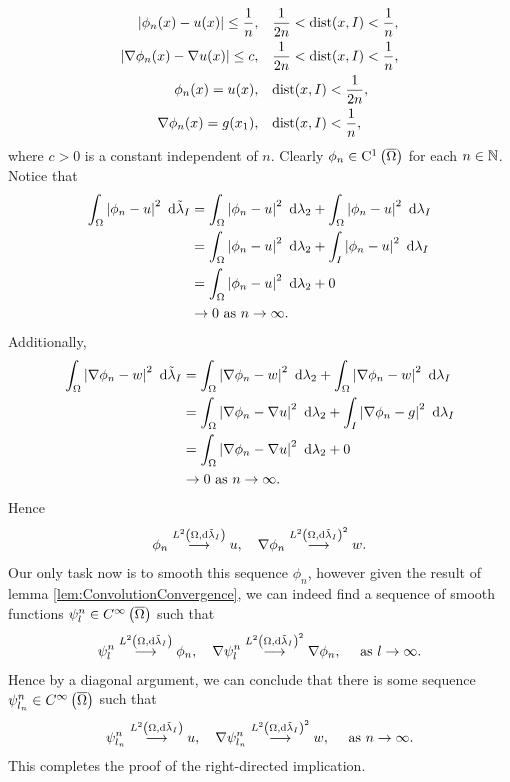 \documentclass[11pt]{report}
\theoremstyle{plain}
\newcommand{\tlambda}{\tilde{\lambda}}
\newcommand{\C}[1]{\mathrm{C}^1\bracs{#1}}
\begin{document}
\begin{enumerate}
\begin{subequations}
\begin{align}
			\left\lvert \phi_n(x) - u(x) \right\rvert \leq \frac{1}{n}, &\quad \frac{1}{2n}<\mathrm{dist}(x,I)<\frac{1}{n}, \\
			\left\lvert \nabla\phi_n(x) - \nabla u(x) \right\rvert \leq c, &\quad \frac{1}{2n}<\mathrm{dist}(x,I)<\frac{1}{n}, \\
			\phi_n(x) = u(x), &\quad \mathrm{dist}(x,I)<\frac{1}{2n}, \\
			\nabla\phi_n(x) = g(x_1), &\quad \mathrm{dist}(x,I)<\frac{1}{n},
		\end{align}
	\end{subequations}
	where $c>0$ is a constant independent of $n$.
	Clearly $\phi_n\in\C{\overline{\ddom}}$ for each $n\in\mathbb{N}$.
	Notice that
	\begin{align*}
		\integral{\ddom}{\abs{\phi_n - u}^2}{\tlambda_I}
		&= \integral{\ddom}{\abs{\phi_n - u}^2}{\lambda_2} + \integral{\ddom}{\abs{\phi_n - u}^2}{\lambda_I} \\
		&= \integral{\ddom}{\abs{\phi_n - u}^2}{\lambda_2} + \integral{I}{\abs{\phi_n - u}^2}{\lambda_I} \\
		&= \integral{\ddom}{\abs{\phi_n - u}^2}{\lambda_2} + 0 \\
		&\rightarrow 0 \toInfty{n}.
	\end{align*}
	Additionally,
	\begin{align*}
		\integral{\ddom}{\abs{\grad\phi_n - w}^2}{\tlambda_I}
		&= \integral{\ddom}{\abs{\grad\phi_n - w}^2}{\lambda_2} + \integral{\ddom}{\abs{\grad\phi_n - w}^2}{\lambda_I} \\
		&= \integral{\ddom}{\abs{\grad\phi_n - \grad u}^2}{\lambda_2} + \integral{I}{\abs{\grad\phi_n - g}^2}{\lambda_I} \\
		&= \integral{\ddom}{\abs{\grad\phi_n - \grad u}^2}{\lambda_2} + 0 \\
		&\rightarrow 0 \toInfty{n}.
	\end{align*}
	Hence
	\begin{align*}
		\phi_n \lconv{\ltwo{\ddom}{\tlambda_I}} u, \quad \grad\phi_n \lconv{\ltwo{\ddom}{\tlambda_I}^2} w.
	\end{align*}
	Our only task now is to smooth this sequence $\phi_n$, however given the result of lemma \ref{lem:ConvolutionConvergence}, we can indeed find a sequence of smooth functions $\psi_l^n\in C^{\infty}\left( \overline{\Omega} \right)$ such that
	\begin{align*}
		\psi_l^n \lconv{\ltwo{\ddom}{\tlambda_I}} \phi_n, \quad \grad\psi_l^n \lconv{\ltwo{\ddom}{\tlambda_I}^2} \grad\phi_n, \quad \toInfty{l}.
	\end{align*}
	Hence by a diagonal argument, we can conclude that there is some sequence $\psi_{l_n}^n\in C^{\infty}\left( \overline{\Omega} \right)$ such that
	\begin{align*}
		\psi_{l_n}^n \lconv{\ltwo{\ddom}{\tlambda_I}} u, \quad \grad\psi_{l_n}^n \lconv{\ltwo{\ddom}{\tlambda_I}^2} w, \quad \toInfty{n}.
	\end{align*}
	This completes the proof of the right-directed implication.
\end{enumerate}
\end{document}
